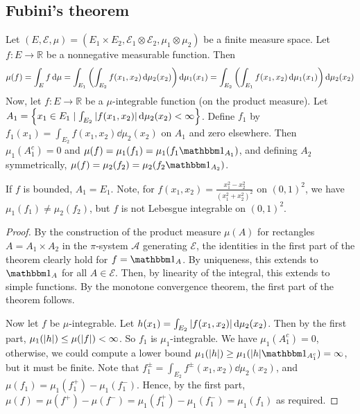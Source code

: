\subsection{Fubini's theorem}
\begin{theorem}
	Let \( (E, \mathcal E, \mu) = (E_1 \times E_2, \mathcal E_1 \otimes \mathcal E_2, \mu_1 \otimes \mu_2) \) be a finite measure space.
	Let \( f \colon E \to \mathbb R \) be a nonnegative measurable function.
	Then
	\[ \mu(f) = \int_E f \dd{\mu} = \int_{E_1} \qty( \int_{E_2} f(x_1,x_2) \dd{\mu_2(x_2)} ) \dd{\mu_1(x_1)} = \int_{E_2} \qty( \int_{E_1} f(x_1,x_2) \dd{\mu_1(x_1)} ) \dd{\mu_2(x_2)} \]
	Now, let \( f \colon E \to \mathbb R \) be a \( \mu \)-integrable function (on the product measure).
	Let \( A_1 = \qty{x_1 \in E_1 \mid \int_{E_2} \abs{f(x_1,x_2)} \dd{\mu_2(x_2)} < \infty} \).
	Define \( f_1 \) by \( f_1(x_1) = \int_{E_2} f(x_1,x_2) \dd{\mu_2(x_2)} \) on \( A_1 \) and zero elsewhere.
	Then \( \mu_1(A_1^c) = 0 \) and \( \mu(f) = \mu_1(f_1) = \mu_1(f_1 \mathbbm 1_{A_1}) \), and defining \( A_2 \) symmetrically, \( \mu(f) = \mu_2(f_2) = \mu_2(f_2 \mathbbm 1_{A_2}) \).
\end{theorem}
\begin{remark}
	If \( f \) is bounded, \( A_1 = E_1 \).
	Note, for \( f(x_1,x_2) = \frac{x_1^2-x_2^2}{(x_1^2+x_2^2)^2} \) on \( (0,1)^2 \), we have \( \mu_1(f_1) \neq \mu_2(f_2) \), but \( f \) is not Lebesgue integrable on \( (0,1)^2 \).
\end{remark}
\begin{proof}
	By the construction of the product measure \( \mu(A) \) for rectangles \( A = A_1 \times A_2 \) in the \( \pi \)-system \( \mathcal A \) generating \( \mathcal E \), the identities in the first part of the theorem clearly hold for \( f = \mathbbm 1_A \).
	By uniqueness, this extends to \( \mathbbm 1_A \) for all \( A \in \mathcal E \).
	Then, by linearity of the integral, this extends to simple functions.
	By the monotone convergence theorem, the first part of the theorem follows.

	Now let \( f \) be \( \mu \)-integrable.
	Let \( h(x_1) = \int_{E_2} \abs{f(x_1,x_2)} \dd{\mu_2(x_2)} \).
	Then by the first part, \( \mu_1(\abs{h}) \leq \mu(\abs{f}) < \infty \).
	So \( f_1 \) is \( \mu_1 \)-integrable.
	We have \( \mu_1(A_1^c) = 0 \), otherwise, we could compute a lower bound \( \mu_1(\abs{h}) \geq \mu_1(\abs{h} \mathbbm 1_{A_1^c}) = \infty \), but it must be finite.
	Note that \( f_1^\pm = \int_{E_2} f^\pm(x_1,x_2) \dd{\mu_2(x_2)} \), and \( \mu(f_1) = \mu_1(f_1^+) - \mu_1(f_1^-) \).
	Hence, by the first part, \( \mu(f) = \mu(f^+) - \mu(f^-) = \mu_1(f_1^+) - \mu_1(f_1^-) = \mu_1(f_1) \) as required.
\end{proof}
